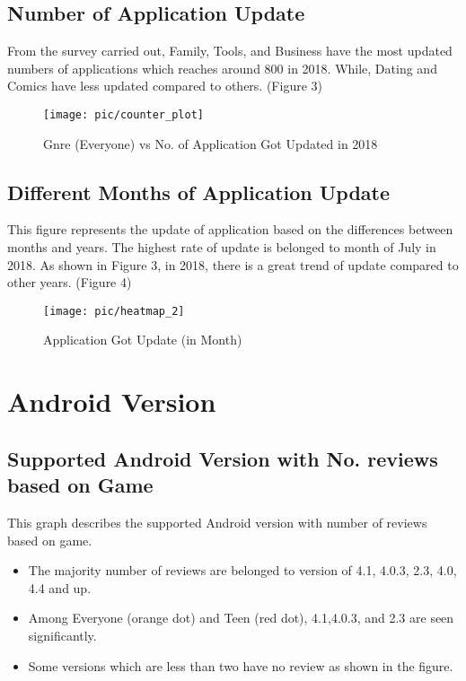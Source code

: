 \documentclass{article}
\begin{document}
\subsection*{Number of Application Update}
From the survey carried out, Family, Tools, and Business have the most updated numbers of applications which reaches around 800 in 2018. While, Dating and Comics have less updated compared to others. (Figure 3)  
\begin{figure}
\centering
\texttt{[image: pic/counter\_plot]}
\caption{Gnre (Everyone) vs No. of Application Got Updated in 2018}
\label{fig:3}
\end{figure}

\subsection*{Different Months of Application Update}
This figure represents the update of application based on the differences between months and years. The highest rate of update is belonged to month of July in 2018. As shown in Figure 3, in 2018, there is a great trend of update compared to other years. (Figure 4)
\begin{figure}
\centering
\texttt{[image: pic/heatmap\_2]}
\caption{Application Got Update (in Month)}
\label{fig:4}
\end{figure}

\section*{Android Version}
\subsection*{Supported Android Version with No. reviews based on Game}
This graph describes the supported Android version with number of reviews based on game.
\begin{itemize}
\item The majority number of reviews are belonged to version of 4.1, 4.0.3, 2.3, 4.0, 4.4 and up.\\
\item Among Everyone (orange dot) and Teen (red dot), 4.1,4.0.3, and 2.3 are seen significantly.\\
\item Some versions which are less than two have no review as shown in the figure.\\
\end{itemize}
\end{document}
